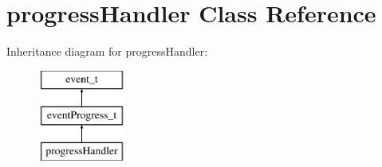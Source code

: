 \hypertarget{classprogressHandler}{\section{progress\-Handler \-Class \-Reference}
\label{classprogressHandler}
}
\-Inheritance diagram for progress\-Handler\-:\begin{figure}[H]
\begin{center}
\leavevmode
\includegraphics[height=3.000000cm]{classprogressHandler}
\end{center}
\end{figure}
